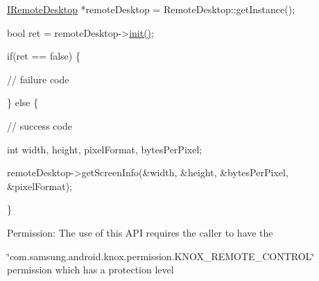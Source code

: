 \begin{DoxyPre}\end{DoxyPre}



\begin{DoxyPre}  \hyperlink{classknoxremotedesktop_1_1IRemoteDesktop}{IRemoteDesktop} *remoteDesktop = RemoteDesktop::getInstance();\end{DoxyPre}



\begin{DoxyPre}  bool ret = remoteDesktop->\hyperlink{classknoxremotedesktop_1_1IRemoteDesktop_a7bed40d98c61713a69cf1dad8b37beae}{init()};\end{DoxyPre}



\begin{DoxyPre}  if(ret == false)  \{\end{DoxyPre}



\begin{DoxyPre}     // failure code\end{DoxyPre}



\begin{DoxyPre}  \} else \{\end{DoxyPre}



\begin{DoxyPre}     // success code\end{DoxyPre}



\begin{DoxyPre}     int	width, height, pixelFormat, bytesPerPixel;\end{DoxyPre}



\begin{DoxyPre}     remoteDesktop->getScreenInfo(&width, &height, &bytesPerPixel, &pixelFormat);\end{DoxyPre}



\begin{DoxyPre}  \}\end{DoxyPre}



\begin{DoxyPre} \end{DoxyPre}


\begin{DoxyParagraph}{\-Permission\-: }
\-The use of this \-A\-P\-I requires the caller to have the
\end{DoxyParagraph}
\char`\"{}com.\-samsung.\-android.\-knox.\-permission.\-K\-N\-O\-X\-\_\-\-R\-E\-M\-O\-T\-E\-\_\-\-C\-O\-N\-T\-R\-O\-L\char`\"{} permission which has a protection level

